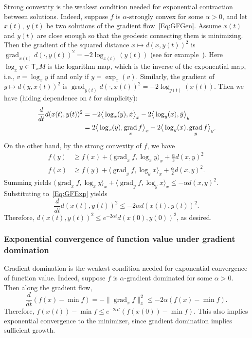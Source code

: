 \documentclass[final,12pt]{colt2018}
\DeclareMathOperator{\grad}{grad}
\newcommand{\T}{\mathsf{T}}
\begin{document}
Strong convexity is the weakest condition needed for exponential contraction between solutions.
Indeed, suppose $f$ is $\alpha$-strongly convex for some $\alpha > 0$, and
let $x(t)$, $y(t)$ be two solutions of the gradient flow~\eqref{Eq:GFGen}.
Assume $x(t)$ and $y(t)$ are close enough so that the geodesic connecting them is minimizing.
Then the gradient of the squared distance $x \mapsto d(x,y(t))^2$ is $\grad_{x(t)} d(\cdot, y(t))^2 = -2\log_{x(t)}(y(t))$ (see for example~\cite[]{F06}).
Here $\log_x y \in \T_x M$ is the logarithm map, which is the inverse of the exponential map, i.e., $v = \log_x y$ if and only if $y = \exp_x(v)$.
Similarly, the gradient of $y \mapsto d(y,x(t))^2$ is $\grad_{y(t)} d(\cdot, x(t))^2 = -2\log_{y(t)}(x(t))$.
Then we have (hiding dependence on $t$ for simplicity):
\begin{align}
\frac{d}{dt} d(x(t),y(t))^2 
&= -2 \big\langle \log_{x}(y), \dot x \big\rangle_{x} - 2 \big\langle \log_{y}(x), \dot y \big\rangle_{y} \notag \\
&=  2 \big\langle \log_{x}(y), \grad_{x} f \big\rangle_{x} + 2 \big\langle \log_{y}(x), \grad_{y} f \big\rangle_{y}.  \label{Eq:GFExp}
\end{align}
On the other hand, by the strong convexity of $f$, we have
\begin{align*}
f(y) &\ge f(x) + \langle \grad_{x} f, \log_x y \rangle_x + \frac{\alpha}{2} d(x,y)^2 \\
f(x) &\ge f(y) + \langle \grad_{y} f, \log_y x \rangle_x + \frac{\alpha}{2} d(x,y)^2.
\end{align*}
Summing yields $\langle \grad_{x} f, \log_x y \rangle_x + \langle \grad_{y} f, \log_y x \rangle_x \le -\alpha d(x,y)^2$.
Substituting to~\eqref{Eq:GFExp} yields
$$\frac{d}{dt} d(x(t),y(t))^2 \le -2\alpha d(x(t),y(t))^2.$$
Therefore, $d(x(t),y(t))^2 \le e^{-2\alpha t} d(x(0),y(0))^2$, as desired.


\subsubsection{Exponential convergence of function value under gradient domination}

Gradient domination is the weakest condition needed for exponential convergence of function value.
Indeed, suppose $f$ is $\alpha$-gradient dominated for some $\alpha > 0$.
Then along the gradient flow,
$$\frac{d}{dt} (f(x) - \min f) = -\|\grad_x f\|^2_x \le -2\alpha (f(x)-\min f).$$
Therefore, $f(x(t)) - \min f \le e^{-2\alpha t} (f(x(0)) - \min f)$.
This also implies exponential convergence to the minimizer, since gradient domination implies sufficient growth.
\end{document}

